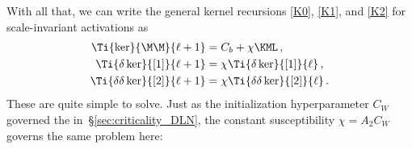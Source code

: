 With all that, we can write the general kernel recursions \eqref{K0}, \eqref{K1}, and \eqref{K2} for scale-invariant activations as
\begin{align}
\Ti{ \ker}{\M\M}{\ell+1}&=C_b+\chi\KML\, ,\label{eq:recursion-scale-invariant-spin-0}\\
\Ti{\delta \ker}{[1]}{\ell+1}&=\chi\Ti{\delta \ker}{[1]}{\ell}\, ,\\
\Ti{ \delta\delta\ker}{[2]}{\ell+1}&=\chi\Ti{ \delta\delta\ker}{[2]}{\ell}\, .
\label{eq:scale-invariant-perpendicular-naive}
\end{align}
These are quite simple to solve. Just as the initialization hyperparameter $C_W$ governed the  in~\S\ref{sec:criticality_DLN}, the constant susceptibility $\chi=A_2 C_W$ governs the same problem here:

